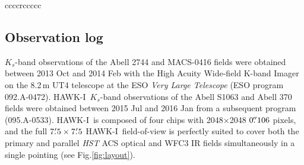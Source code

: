 \documentclass[preprint2]{aastex6}
\gdef\mum{$\mu\mathrm{m}$}
\gdef\HAWKI{\mbox{HAWK-I}}
\begin{document}
\begin{deluxetable*}{ccccrccccc}
\end{deluxetable*}

\subsection{Observation log}
\label{s:log}

\begin{figure*}[!t]
\caption{Layout of the Frontier Fields $K_s$-band mosaics.  The positions of the \textit{HST} cluster and parallel fields are shown in the blue (ACS optical) and red (WFC3 IR) polygons.  The light blue polygons in the MACS-0717 field show additional wide-field ACS imaging coverage from  programs GO-9722 and GO-10420 \citep[PI: Ebeling;][]{ma:11}.  The area covered by deep imaging in the \textit{Spitzer}/IRAC 3.6 and 4.5\,\mum\ channels is shown in orange, with the cluster fields indicated by the dashed lines.  The \HAWKI\ field of view is perfectly suited (Abell 2744, MACS-0416, Abell S1063 and Abell 370) for simultaneous imaging of the cluster+parallel field pairs, which require two separate pointings with MOSFIRE (MACS-0717 and MACS-1149).  The footprint of additional archival \HAWKI\ coverage of the MACS-1149 field is indicated by the gray square in the lower right panel.\label{fig:layout}}  
\end{figure*}

$K_s$-band observations of the Abell 2744 and MACS-0416 fields were obtained between 2013 Oct and 2014 Feb with the High Acuity Wide-field K-band Imager \citep[\HAWKI;][]{hawki, hawki2} on the 8.2\,m UT4 telescope at the ESO \textit{Very Large Telescope} (ESO program \mbox{092.A-0472}).  \HAWKI\ $K_s$-band observations of the Abell S1063 and Abell 370 fields were obtained between 2015 Jul and 2016 Jan from a subsequent program (095.A-0533).  \HAWKI\ is composed of four chips with 2048$\times$2048 $0\mbox{$.\!\!^{\prime\prime}$}106$ pixels, and the full $7\mbox{$.\mkern-4mu^\prime$}5\times7\mbox{$.\mkern-4mu^\prime$}5$ \HAWKI\ field-of-view is perfectly suited to cover both the primary and parallel \textit{HST} ACS optical and WFC3 IR fields simultaneously in a single pointing (see Fig.\ref{fig:layout}).
\end{document}
